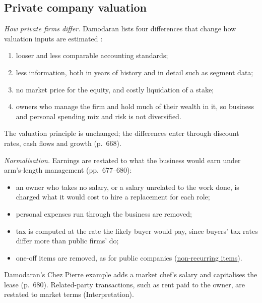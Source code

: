 \subsection{Private company valuation}

\begin{qfmethod}\label{meth:private-earnings-normalisation}
 \emph{How private firms differ.} Damodaran lists four differences that change how valuation inputs are estimated \citep[pp.~667--668]{investment-valuation-2012}:
\begin{enumerate}
\item looser and less comparable accounting standards;
\item less information, both in years of history and in detail such as segment data;
\item no market price for the equity, and costly liquidation of a stake;
\item owners who manage the firm and hold much of their wealth in it, so business and personal spending mix and risk is not diversified.
\end{enumerate}
The valuation principle is unchanged; the differences enter through discount rates, cash flows and growth (p.~668).

\emph{Normalisation.} Earnings are restated to what the business would earn under arm's-length management (pp.~677--680):
\begin{itemize}
\item an owner who takes no salary, or a salary unrelated to the work done, is charged what it would cost to hire a replacement for each role;
\item personal expenses run through the business are removed;
\item tax is computed at the rate the likely buyer would pay, since buyers' tax rates differ more than public firms' do;
\item one-off items are removed, as for public companies (\hyperref[meth:non-recurring-items]{non-recurring items}).
\end{itemize}
Damodaran's Chez Pierre example adds a market chef's salary and capitalises the lease (p.~680). Related-party transactions, such as rent paid to the owner, are restated to market terms (Interpretation).


\end{qfmethod}
